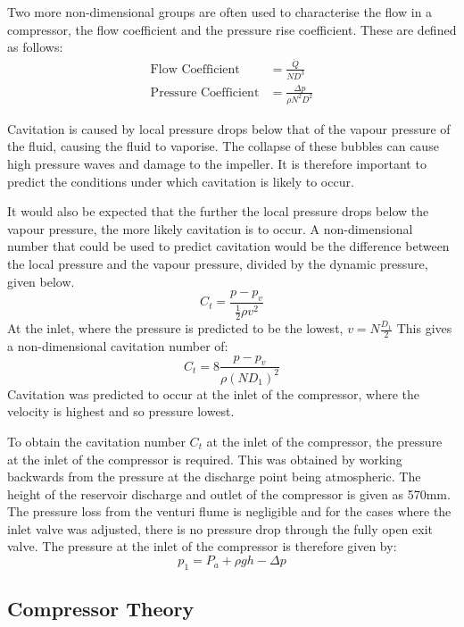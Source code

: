 \documentclass{article}
\begin{document}
Two more non-dimensional groups are often used to characterise the flow in a compressor, the flow coefficient and the pressure rise coefficient.
These are defined as follows:
\begin{align}
    \text{Flow Coefficient} &= \frac{\dot{Q}}{ND^3} \label{eq:flow_coeff}\\
    \text{Pressure Coefficient} &= \frac{\Delta p}{\rho N^2 D^2} \label{eq:pressure_coeff}
\end{align}

Cavitation is caused by local pressure drops below that of the vapour pressure of the fluid, causing the fluid to vaporise.
The collapse of these bubbles can cause high pressure waves and damage to the impeller.
It is therefore important to predict the conditions under which cavitation is likely to occur.

It would also be expected that the further the local pressure drops below the vapour pressure, the more likely cavitation is to occur.
A non-dimensional number that could be used to predict cavitation would be the difference between the local pressure and the vapour pressure, divided by the dynamic pressure, given below.
\begin{equation}
    C_t = \frac{p - p_v}{\frac{1}{2}\rho v^2}
\end{equation}
At the inlet, where the pressure is predicted to be the lowest, $v = N \frac{D_1}{2}$
This gives a non-dimensional cavitation number of:
\begin{equation}
    C_t = 8\frac{p - p_v}{\rho (ND_1)^2}
\end{equation}
Cavitation was predicted to occur at the inlet of the compressor, where the velocity is highest and so pressure lowest.

To obtain the cavitation number $C_t$ at the inlet of the compressor, the pressure at the inlet of the compressor is required.
This was obtained by working backwards from the pressure at the discharge point being atmospheric.
The height of the reservoir discharge and outlet of the compressor is given as 570mm. The pressure loss from the
venturi flume is negligible and for the cases where the inlet valve was adjusted, there is no pressure drop through the fully open exit valve.
The pressure at the inlet of the compressor is therefore given by:
\begin{equation}
    p_1 =  P_a + \rho g h - \Delta p
\end{equation}

\subsection{Compressor Theory}
\end{document}
